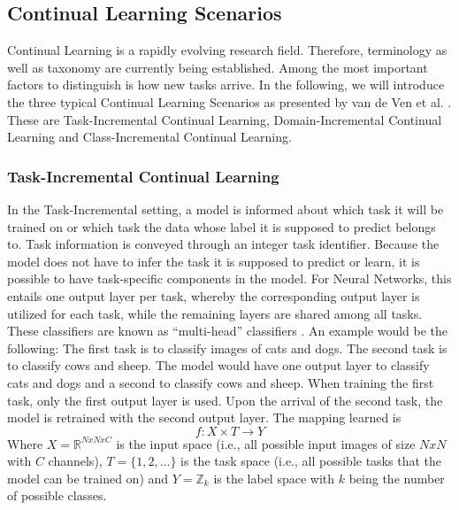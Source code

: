 \subsection{Continual Learning Scenarios}
\label{sec:ContinualLearningScenarios}
Continual Learning is a rapidly evolving research field. Therefore, terminology as well as taxonomy are currently being established. Among the most
important factors to distinguish is how new tasks arrive. In the following, we will introduce the three typical Continual Learning Scenarios as
presented by van de Ven et al. \cite{van2022three}. These are Task-Incremental Continual Learning, Domain-Incremental Continual Learning and
Class-Incremental Continual Learning.

\subsubsection{Task-Incremental Continual Learning}
\label{sec:TaskIncrementalContinualLearning}
In the Task-Incremental setting, a model is informed about which task it will be trained on or which task the data whose label it is supposed to predict belongs to.
Task information is conveyed through an integer task identifier. Because the model does not have to infer the task it is supposed to predict
or learn, it is possible to have task-specific components in the model. For Neural Networks, this entails one output layer per task, whereby the corresponding
output layer is utilized for each task, while the remaining layers are shared among all tasks. These classifiers are known as \enquote{multi-head} classifiers
\cite{vandeven2019generative}. An example would be the following: The first task is to classify images of cats and dogs. The second task is to classify cows and sheep.
The model would have one output layer to classify cats and dogs and a second to classify cows and sheep. When training the first task, only the first output layer
is used. Upon the arrival of the second task, the model is retrained with the second output layer. The mapping learned is 
\begin{equation}
    f: X \times T \rightarrow Y
\end{equation}
Where $X = \mathbb{R}^{N x N x C}$ is the input space (i.e., all possible input images of size $N x N$ with $C$ channels), $T = \{1,2,\ldots\}$ is the task space (i.e., all possible
tasks that the model can be trained on) and $Y = \mathbb{Z}_{k}$ is the label space with $k$ being the number of possible classes.
